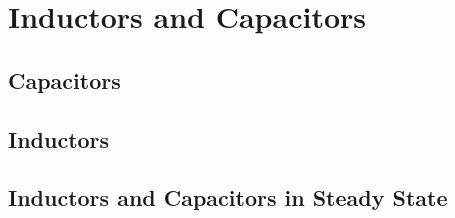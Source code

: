 \chapter{Inductors and Capacitors}
\label{cha:inductors_capacitors}
    \section{Capacitors}
    \section{Inductors}
    \section{Inductors and Capacitors in Steady State}